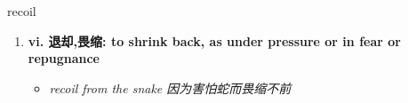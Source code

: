 
\begin{frame}
{\huge recoil}
\begin{center}
\begin{enumerate}\Large
  \item \textbf{vi. 退却,畏缩: to shrink back, as under pressure or in fear or repugnance}
  \begin{itemize}
    \item \em{\Large{recoil from the snake 因为害怕蛇而畏缩不前}}
  \end{itemize}
\end{enumerate}
\end{center}
\end{frame}
